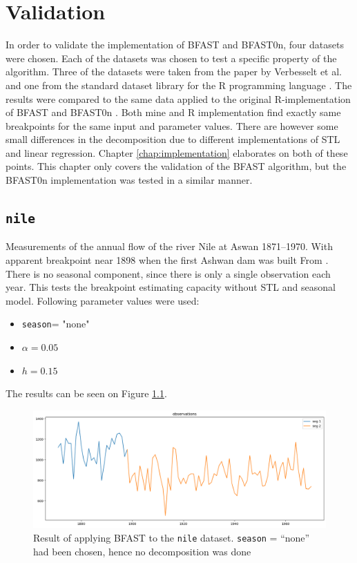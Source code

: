 \documentclass[main.tex]{subfiles}
\begin{document}
\chapter{Validation}
\label{chap:validation}
In order to validate the implementation of BFAST and BFAST0n, four datasets were
chosen. Each of the datasets was chosen to test a specific
property of the algorithm. Three of the datasets were
taken from the paper by Verbesselt et al. \cite{bfast} and one from the standard
dataset library for the R programming language \cite{r-datasets}. The results were compared to
the same data applied to the original R-implementation of BFAST and BFAST0n
\cite{bfast-github}. Both mine and R implementation find exactly same
breakpoints for the same input and parameter values. There are however some
small differences in the decomposition due to different implementations of STL
and linear regression. Chapter \ref{chap:implementation} elaborates on both of
these points. This chapter only covers the validation of the BFAST algorithm,
but the BFAST0n implementation was tested in a similar manner.

\section{\texttt{nile}}
\label{sec:val_nile}
Measurements of the annual flow of the river Nile at Aswan 
1871–1970. With apparent breakpoint near 1898 when the first Ashwan dam was built
From \cite{r-datasets}. There is
no seasonal component, since there is only a single observation each year. This
tests the breakpoint estimating capacity without STL and seasonal model.
Following parameter values were used:
\begin{itemize}
\item \texttt{season}= "none"
\item $\alpha = 0.05$
\item $h = 0.15$
\end{itemize}
The results can be seen on Figure \ref{plt:nile}.
\begin{figure}
  \centering
  \includegraphics[width=\textwidth]{imgs/nile.png}
  \caption{Result of applying BFAST to the \texttt{nile} dataset.
    \texttt{season} = ``none'' had been chosen, hence no decomposition was done}
  \label{plt:nile}
\end{figure}
\end{document}

